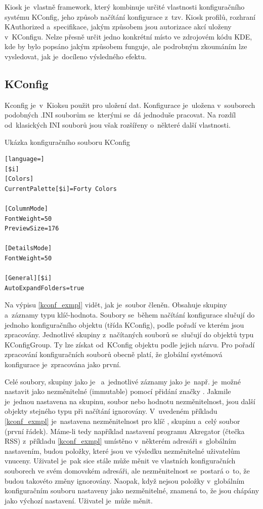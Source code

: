 Kiosk je~vlastně framework, který kombinuje určité vlastnosti konfiguračního systému KConfig, jeho způsob načítání konfigurace z~tzv. Kiosk profilů, rozhraní KAuthorized a~specifikace, jakým způsobem jsou autorizace akcí uloženy v~KConfigu. Nelze přesně určit jedno konkrétní místo ve zdrojovém kódu KDE, kde by bylo popsáno jakým způsobem funguje, ale podrobným zkoumáním lze vysledovat, jak je~docíleno výsledného efektu.

\subsection*{KConfig}
Kconfig je~v~Kioksu použit pro uložení dat. Konfigurace je~uložena v~souborech podobných .INI souborům se~kterými se~dá jednoduše pracovat. Na rozdíl od~klasických INI souborů jsou však rozšířeny o~některé další vlastnosti.\cite{wikiINIfiles}
\begin{mylisting}
\caption{Ukázka konfiguračního souboru KConfig}
\label{kconf_exmpl}
\begin{lstlisting}[language=]
[$i]
[Colors]
CurrentPalette[$i]=Forty Colors

[ColumnMode]
FontWeight=50
PreviewSize=176

[DetailsMode]
FontWeight=50

[General][$i]
AutoExpandFolders=true
\end{lstlisting}
\end{mylisting}

Na výpisu \ref{kconf_exmpl} vidět, jak je~soubor členěn. Obsahuje skupiny a~záznamy typu klíč-hodnota. Soubory se~během načítání konfigurace slučují do jednoho konfiguračního objektu (třída KConfig), podle pořadí ve kterém jsou zpracovány. Jednotlivé skupiny z~načítaných souborů se~slučují do objektů typu KConfigGroup. Ty lze získat od~KConfig objektu podle jejich názvu. Pro pořadí zpracování konfiguračních souborů obecně platí, že globální systémová konfigurace je~zpracována jako první.

Celé soubory, skupiny jako je~ a~jednotlivé záznamy jako je~např. \linebreak{} je~možné nastavit jako nezměnitelné (immutable) pomocí přidání značky \cppc{[\$i]}. Jakmile je~jednou nastavena na skupinu, soubor nebo hodnotu nezměnitelnost, jsou další objekty stejného typu při načítání ignorovány. V~uvedeném příkladu \ref{kconf_exmpl} je~nastavena nezměnitelnost pro klíč , skupinu  a~celý soubor (první řádek). Máme-li tedy například nastavení programu Akregator (čtečka RSS) z~příkladu \ref{kconf_exmpl} umístěno v~některém adresáři s~globálním nastavením, budou položky, které jsou ve výsledku nezměnitelné uživatelům vnuceny. Uživatel je~pak sice stále může měnit ve vlastních konfiguračních souborech ve svém domovském adresáři, ale nezměnitelnost se~postará o~to, že budou takovéto změny ignorovány. Naopak, když nejsou položky v~globálním konfiguračním souboru nastaveny jako nezměnitelné, znamená to, že jsou chápány jako výchozí nastavení. Uživatel je~může měnit.


